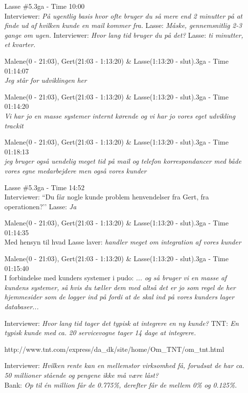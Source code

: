 \begin{thebibliography}{9}
	Lasse \#5.3ga - Time 10:00 \\
	Interviewer: \textit{På ugentlig basis hvor ofte bruger du så mere end 2 minutter på at finde ud af hvilken kunde en mail kommer fra.} Lasse: \textit{Måske, gennemsnitlig 2-3 gange om ugen.} Interviewer: \textit{Hvor lang tid bruger du på det?} Lasse: \textit{ti minutter, et kvarter.}

	Malene(0 - 21:03), Gert(21:03 - 1:13:20) \& Lasse(1:13:20 - slut).3ga - Time 01:14:07\\
	\textit{Jeg står for udviklingen her}
 
	Malene(0 - 21:03), Gert(21:03 - 1:13:20) \& Lasse(1:13:20 - slut).3ga - Time 01:14:20\\
	\textit{Vi har jo en masse systemer internt kørende og vi har jo vores eget udvikling trackit}

	Malene(0 - 21:03), Gert(21:03 - 1:13:20) \& Lasse(1:13:20 - slut).3ga - Time 01:18:13\\
	\textit{jeg bruger også uendelig meget tid på mail og telefon korrespondancer med både vores egne medarbejdere men også vores kunder}

	Lasse \#5.3ga - Time 14:52 \\
	Interviewer: ``Du får nogle kunde problem henvendelser fra Gert, fra operationen?’’
Lasse: \textit{Ja}

	Malene(0 - 21:03), Gert(21:03 - 1:13:20) \& Lasse(1:13:20 - slut).3ga - Time 01:14:35\\
	Med hensyn til hvad Lasse laver: \textit{handler meget om integration af vores kunder}

	Malene(0 - 21:03), Gert(21:03 - 1:13:20) \& Lasse(1:13:20 - slut).3ga - Time 01:15:40\\
	I forbindelse med kunders systemer i pudo: \textit{... og så bruger vi en masse af kundens systemer, så hvis du tæller dem med altså det er jo som regel de her hjemmesider som de logger ind på fordi at de skal ind på vores kunders lager databaser...}

	Interviewer: \textit{Hvor lang tid tager det typisk at integrere en ny kunde?}
	TNT: \textit{En typisk kunde med ca. 20 servicevogne tager 14 dage at integrere.}

	http://www.tnt.com/express/da\_dk/site/home/Om\_TNT/om\_tnt.html

	Interviewer: \textit{Hvilken rente kan en mellemstor virksomhed få, forudsat de har ca. 50 millioner stående og pengene ikke må være låst?}\\
	Bank: \textit{Op til én million får de 0.775\%, derefter får de mellem 0\% og 0.125\%.}


\end{thebibliography}
